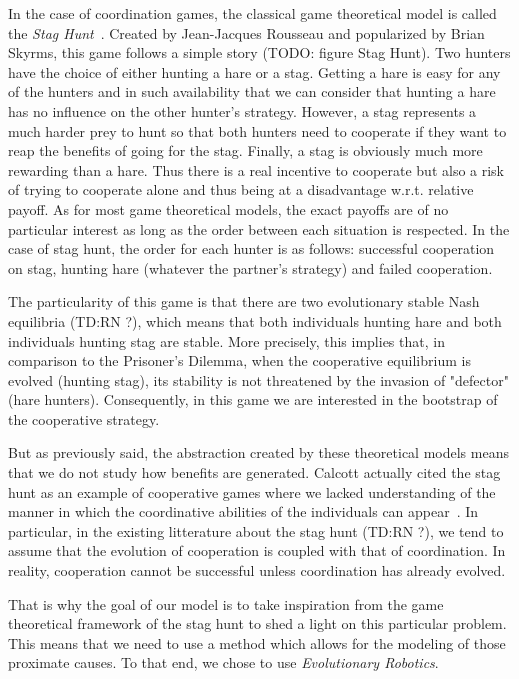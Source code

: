     In the case of coordination games, the classical game theoretical model is called the \emph{Stag Hunt}~\parencite{Skyrms2004}. Created by Jean-Jacques Rousseau and popularized by Brian Skyrms, this game follows a simple story (TODO: figure Stag Hunt). Two hunters have the choice of either hunting a hare or a stag. Getting a hare is easy for any of the hunters and in such availability that we can consider that hunting a hare has no influence on the other hunter's strategy. However, a stag represents a much harder prey to hunt so that both hunters need to cooperate if they want to reap the benefits of going for the stag. Finally, a stag is obviously much more rewarding than a hare. Thus there is a real incentive to cooperate but also a risk of trying to cooperate alone and thus being at a disadvantage w.r.t. relative payoff. As for most game theoretical models, the exact payoffs are of no particular interest as long as the order between each situation is respected. In the case of stag hunt, the order for each hunter is as follows: successful cooperation on stag, hunting hare (whatever the partner's strategy) and failed cooperation.

    The particularity of this game is that there are two evolutionary stable Nash equilibria (TD:RN ?), which means that both individuals hunting hare and both individuals hunting stag are stable. More precisely, this implies that, in comparison to the Prisoner's Dilemma, when the cooperative equilibrium is evolved (hunting stag), its stability is not threatened by the invasion of "defector" (hare hunters). Consequently, in this game we are interested in the bootstrap of the cooperative strategy.


    But as previously said, the abstraction created by these theoretical models means that we do not study how benefits are generated. Calcott actually cited the stag hunt as an example of cooperative games where we lacked understanding of the manner in which the coordinative abilities of the individuals can appear~\parencite{Calcott2007a}. In particular, in the existing litterature about the stag hunt (TD:RN ?), we tend to assume that the evolution of cooperation is coupled with that of coordination. In reality, cooperation cannot be successful unless coordination has already evolved.

    That is why the goal of our model is to take inspiration from the game theoretical framework of the stag hunt to shed a light on this particular problem. This means that we need to use a method which allows for the modeling of those proximate causes. To that end, we chose to use \emph{Evolutionary Robotics}.


